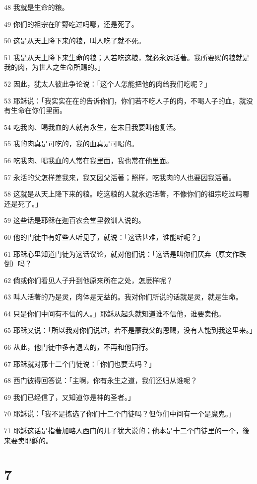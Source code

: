 \par 48 我就是生命的粮。
\par 49 你们的祖宗在旷野吃过吗哪，还是死了。
\par 50 这是从天上降下来的粮，叫人吃了就不死。
\par 51 我是从天上降下来生命的粮；人若吃这粮，就必永远活著。我所要赐的粮就是我的肉，为世人之生命所赐的。」
\par 52 因此，犹太人彼此争论说：「这个人怎能把他的肉给我们吃呢？」
\par 53 耶稣说：「我实实在在的告诉你们，你们若不吃人子的肉，不喝人子的血，就没有生命在你们里面。
\par 54 吃我肉、喝我血的人就有永生，在末日我要叫他复活。
\par 55 我的肉真是可吃的，我的血真是可喝的。
\par 56 吃我肉、喝我血的人常在我里面，我也常在他里面。
\par 57 永活的父怎样差我来，我又因父活著；照样，吃我肉的人也要因我活著。
\par 58 这就是从天上降下来的粮。吃这粮的人就永远活著，不像你们的祖宗吃过吗哪还是死了。」
\par 59 这些话是耶稣在迦百农会堂里教训人说的。
\par 60 他的门徒中有好些人听见了，就说：「这话甚难，谁能听呢？」
\par 61 耶稣心里知道门徒为这话议论，就对他们说：「这话是叫你们厌弃（原文作跌倒）吗？
\par 62 倘或你们看见人子升到他原来所在之处，怎麽样呢？
\par 63 叫人活著的乃是灵，肉体是无益的。我对你们所说的话就是灵，就是生命。
\par 64 只是你们中间有不信的人。」耶稣从起头就知道谁不信他，谁要卖他。
\par 65 耶稣又说：「所以我对你们说过，若不是蒙我父的恩赐，没有人能到我这里来。」
\par 66 从此，他门徒中多有退去的，不再和他同行。
\par 67 耶稣就对那十二个门徒说：「你们也要去吗？」
\par 68 西门彼得回答说：「主啊，你有永生之道，我们还归从谁呢？
\par 69 我们已经信了，又知道你是神的圣者。」
\par 70 耶稣说：「我不是拣选了你们十二个门徒吗？但你们中间有一个是魔鬼。」
\par 71 耶稣这话是指著加略人西门的儿子犹大说的；他本是十二个门徒里的一个，後来要卖耶稣的。

\chapter{7}

